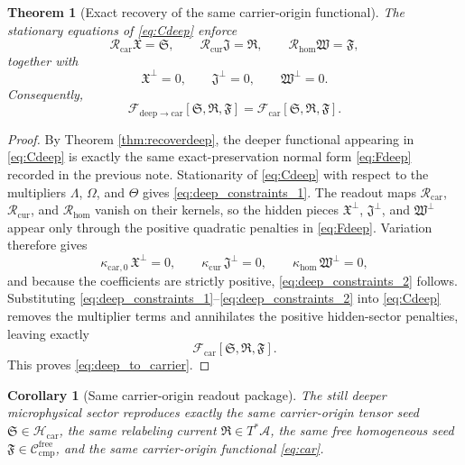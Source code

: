 \documentclass[11pt]{article}
\newcommand{\Sub}{\mathcal A}
\newcommand{\CompFree}{\mathscr C_{\mathrm{cmp}}^{\mathrm{free}}}
\newcommand{\CarrierFunctional}{\mathscr F_{\mathrm{car}}}
\newcommand{\DeepToCar}{\mathscr F_{\mathrm{deep}\to\mathrm{car}}}
\newcommand{\CarrierClass}{\mathscr H_{\mathrm{car}}}
\newcommand{\CarrierSeed}{\mathfrak S}
\newcommand{\RelabelSeed}{\mathfrak R}
\newcommand{\FreeSeed}{\mathfrak F}
\newcommand{\PreCarGap}{\kappa_{\mathrm{car},0}}
\newcommand{\CurrentGap}{\kappa_{\mathrm{cur}}}
\newcommand{\HomGap}{\kappa_{\mathrm{hom}}}
\newcommand{\StrainMult}{\Lambda}
\newcommand{\NeutralMult}{\Omega}
\newcommand{\FreeMult}{\Theta}
\newcommand{\DeepTensor}{\mathfrak X}
\newcommand{\DeepRelabel}{\mathfrak J}
\newcommand{\DeepFree}{\mathfrak W}
\newcommand{\CarRead}{\mathcal R_{\mathrm{car}}}
\newcommand{\CurRead}{\mathcal R_{\mathrm{cur}}}
\newcommand{\HomRead}{\mathcal R_{\mathrm{hom}}}
\newtheorem{corollary}{Corollary}
\newtheorem{theorem}{Theorem}
\begin{document}
\begin{theorem}[Exact recovery of the same carrier-origin functional]
\label{thm:recover_car}
The stationary equations of \eqref{eq:Cdeep} enforce
\begin{equation}
\CarRead\DeepTensor=\CarrierSeed,
\qquad
\CurRead\DeepRelabel=\RelabelSeed,
\qquad
\HomRead\DeepFree=\FreeSeed,
\label{eq:deep_constraints_1}
\end{equation}
together with
\begin{equation}
\DeepTensor^{\perp}=0,
\qquad
\DeepRelabel^{\perp}=0,
\qquad
\DeepFree^{\perp}=0.
\label{eq:deep_constraints_2}
\end{equation}
Consequently,
\begin{equation}
\DeepToCar[\CarrierSeed,\RelabelSeed,\FreeSeed]
=
\CarrierFunctional[\CarrierSeed,\RelabelSeed,\FreeSeed].
\label{eq:deep_to_carrier}
\end{equation}
\end{theorem}

\begin{proof}
By Theorem \ref{thm:recoverdeep}, the deeper functional appearing in \eqref{eq:Cdeep} is exactly the same exact-preservation normal form \eqref{eq:Fdeep} recorded in the previous note. Stationarity of \eqref{eq:Cdeep} with respect to the multipliers \(\StrainMult\), \(\NeutralMult\), and \(\FreeMult\) gives \eqref{eq:deep_constraints_1}. The readout maps \(\CarRead\), \(\CurRead\), and \(\HomRead\) vanish on their kernels, so the hidden pieces \(\DeepTensor^{\perp}\), \(\DeepRelabel^{\perp}\), and \(\DeepFree^{\perp}\) appear only through the positive quadratic penalties in \eqref{eq:Fdeep}. Variation therefore gives
\[
\PreCarGap\,\DeepTensor^{\perp}=0,
\qquad
\CurrentGap\,\DeepRelabel^{\perp}=0,
\qquad
\HomGap\,\DeepFree^{\perp}=0,
\]
and because the coefficients are strictly positive, \eqref{eq:deep_constraints_2} follows. Substituting \eqref{eq:deep_constraints_1}--\eqref{eq:deep_constraints_2} into \eqref{eq:Cdeep} removes the multiplier terms and annihilates the positive hidden-sector penalties, leaving exactly
\[
\CarrierFunctional[\CarrierSeed,\RelabelSeed,\FreeSeed].
\]
This proves \eqref{eq:deep_to_carrier}.
\end{proof}

\begin{corollary}[Same carrier-origin readout package]
\label{cor:same_car_package}
The still deeper microphysical sector reproduces exactly the same carrier-origin tensor seed \(\CarrierSeed\in\CarrierClass\), the same relabeling current \(\RelabelSeed\in T^*\Sub\), the same free homogeneous seed \(\FreeSeed\in\CompFree\), and the same carrier-origin functional \eqref{eq:car}.
\end{corollary}
\end{document}
